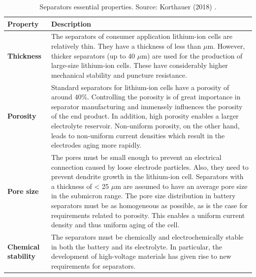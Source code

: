 \begin{table}[H]
    \centering
        \begin{footnotesize}
            \begin{tabular}{|p{18mm} p{132mm}|}
                \hline
                \rowcolor{bluepoli!40}
                \textbf{Property} & \textbf{Description}\T\B \\
                \hline \hline
                \textbf{Thickness} & The separators of consumer application lithium-ion cells are relatively thin. They have a thickness of less than $\mu$m. However, thicker separators (up to 40 $\mu$m) are used for the production of large-size lithium-ion cells. These have considerably higher mechanical stability and puncture resistance.\T\B\\
                \hline
                \textbf{Porosity} & Standard separators for lithium-ion cells have a porosity of around 40\%. Controlling the porosity is of great importance in separator manufacturing and immensely influences the porosity of the end product. In addition, high porosity enables a larger electrolyte reservoir. Non-uniform porosity, on the other hand, leads to non-uniform current densities which result in the electrodes aging more rapidly.\T\B\\
                \hline
                \textbf{Pore size} & The pores must be small enough to prevent an electrical connection caused by loose electrode particles. Also, they need to prevent dendrite growth in the lithium-ion cell. Separators with a thickness of < 25 $\mu$m are assumed to have an average pore size in the submicron range. The pore size distribution in battery separators must be as homogeneous as possible, as is the case for requirements related to porosity. This enables a uniform current density and thus uniform aging of the cell.\T\B\\
                \hline
                \textbf{Chemical stability} & The separators must be chemically and electrochemically stable in both the battery and its electrolyte. In particular, the development of high-voltage materials has given rise to new requirements for separators.\T\B\\
                \hline
                \end{tabular}
                \\[10pt]
                \caption[Separators essential properties]{Separators essential properties. Source: Korthauer (2018) \cite{korthauer2018lithium}.}
                \label{table:separator-properties}
        \end{footnotesize}
\end{table}

